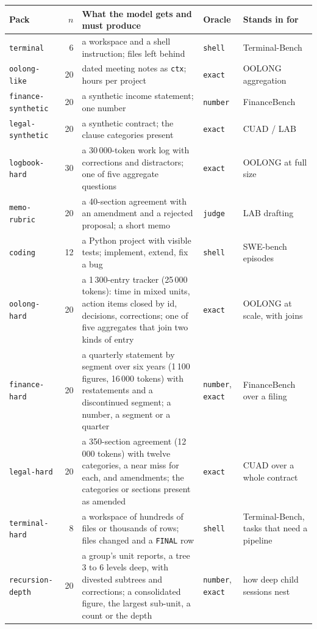 \documentclass[11pt,a4paper]{article}
\newcommand{\code}[1]{\texttt{#1}}
\begin{document}
\begin{table}[htbp]
\centering
\small
\begin{tabularx}{\textwidth}{@{}l r Y l l@{}}
\toprule
Pack & $n$ & What the model gets and must produce & Oracle & Stands in for \\
\midrule
\code{terminal} & 6 & a workspace and a shell instruction; files left behind & \code{shell} & Terminal-Bench \\
\code{oolong-like} & 20 & dated meeting notes as \code{ctx}; hours per project & \code{exact} & OOLONG aggregation \\
\code{finance-synthetic} & 20 & a synthetic income statement; one number & \code{number} & FinanceBench \\
\code{legal-synthetic} & 20 & a synthetic contract; the clause categories present & \code{exact} & CUAD / LAB \\
\code{logbook-hard} & 30 & a 30\,000-token work log with corrections and distractors; one of five aggregate questions & \code{exact} & OOLONG at full size \\
\code{memo-rubric} & 20 & a 40-section agreement with an amendment and a rejected proposal; a short memo & \code{judge} & LAB drafting \\
\code{coding} & 12 & a Python project with visible tests; implement, extend, fix a bug & \code{shell} & SWE-bench episodes \\
\addlinespace
\code{oolong-hard} & 20 & a 1\,300-entry tracker (25\,000 tokens): time in mixed units, action items closed by id, decisions, corrections; one of five aggregates that join two kinds of entry & \code{exact} & OOLONG at scale, with joins \\
\code{finance-hard} & 20 & a quarterly statement by segment over six years (1\,100 figures, 16\,000 tokens) with restatements and a discontinued segment; a number, a segment or a quarter & \code{number}, \code{exact} & FinanceBench over a filing \\
\code{legal-hard} & 20 & a 350-section agreement (12\,000 tokens) with twelve categories, a near miss for each, and amendments; the categories or sections present as amended & \code{exact} & CUAD over a whole contract \\
\code{terminal-hard} & 8 & a workspace of hundreds of files or thousands of rows; files changed and a \code{FINAL} row & \code{shell} & Terminal-Bench, tasks that need a pipeline \\
\addlinespace
\code{recursion-depth} & 20 & a group's unit reports, a tree 3 to 6 levels deep, with divested subtrees and corrections; a consolidated figure, the largest sub-unit, a count or the depth & \code{number}, \code{exact} & how deep child sessions nest \\

\end{tabularx}
\end{table}
\end{document}
